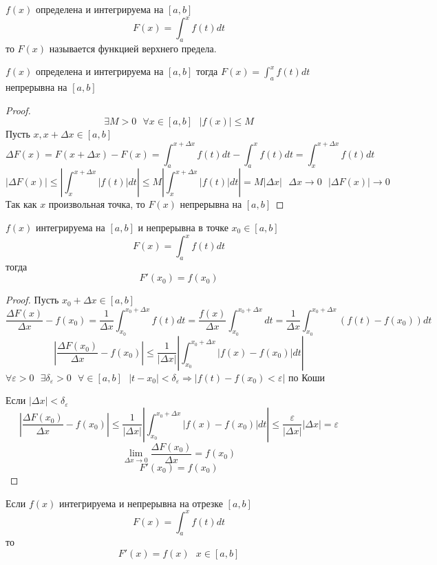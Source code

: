 \begin{defin}
$f(x)$ определена и интегрируема на $[a, b]$
\[F(x) = \int^x_a f(t)dt\]
то $F(x)$ называется функцией верхнего предела.
\end{defin}

\begin{theorem}
  $f(x)$ определена и интегрируема на $[a,b]$ тогда $F(x) = \int^x_a f(t)dt$
  непрерывна на $[a,b]$
\end{theorem}

\begin{proof}
  \[\exists M > 0 ~~~ \forall x \in [a, b] ~~~ |f(x)| \le M\]
  Пусть $x, x + \Delta x \in [a, b]$
  \[\Delta F(x) = F(x + \Delta x) - F(x) = \int^{x + \Delta x}_a f(t)dt -
    \int^x_a f(t)dt = \int^{x + \Delta x}_x f(t)dt\]
  \[|\Delta F(x)| \le \left |\int^{x + \Delta x}_x |f(t)|dt \right| \le
    M \left |\int^{x + \Delta x}_x |f(t)| dt \right| = M |\Delta x|
    ~~~ \Delta x \to 0 ~~~ |\Delta F(x)| \to 0\]
  Так как $x$ произвольная точка, то $F(x)$ непрерывна на $[a,b]$
\end{proof}

\begin{theorem}
  $f(x)$ интегрируема на $[a,b]$ и непрерывна в точке $x_0 \in [a,b]$
  \[F(x) = \int^x_a f(t)dt\]
  тогда
  \[F'(x_0) = f(x_0)\]
\end{theorem}

\begin{proof}
  Пусть $x_0 + \Delta x \in [a, b]$
  \[\frac{\Delta F(x)}{\Delta x} - f(x_0) = \frac{1}{\Delta x}
    \int^{x_0 + \Delta x}_{x_0} f(t)dt = \frac{f(x)}{\Delta x}
    \int^{x_0 + \Delta x}_{x_0} dt = \frac{1}{\Delta x}
    \int^{x_0 + \Delta x}_{x_0} (f(t) - f(x_0))dt\]
  \[\left | \frac{\Delta F(x_0)}{\Delta x} - f(x_0)
    \right | \le \frac{1}{|\Delta x|} \left |
    \int^{x_0 + \Delta x}_{x_0} |f(x) - f(x_0)|dt \right |\]
  $\forall \varepsilon > 0 ~~~ \exists \delta_\varepsilon > 0
    ~~~ \forall \in [a, b] ~~~ |t - x_0| < \delta_\varepsilon \Rightarrow
    |f(t) - f(x_0) < \varepsilon|$ по Коши

  Если $|\Delta x| < \delta_\varepsilon$
  \[\left | \frac{\Delta F(x_0)}{\Delta x} - f(x_0) \right | \le
    \frac{1}{|\Delta x|} \left | \int^{x_0 + \Delta x}_{x_0} |f(x) -
    f(x_0)|dt \right | \le \frac{\varepsilon}{|\Delta x|} |\Delta x| =
    \varepsilon\]
  \[\lim_{\Delta x \to 0} \frac{\Delta F(x_0)}{\Delta x} = f(x_0)\]
  \[F'(x_0) = f(x_0)\]
\end{proof}

\begin{theorem}
  Если $f(x)$ интегрируема и непрерывна на отрезке $[a, b]$
  \[F(x) = \int^x_a f(t)dt\] то
  \[F'(x) = f(x) ~~~ x \in [a, b]\]
\end{theorem}

